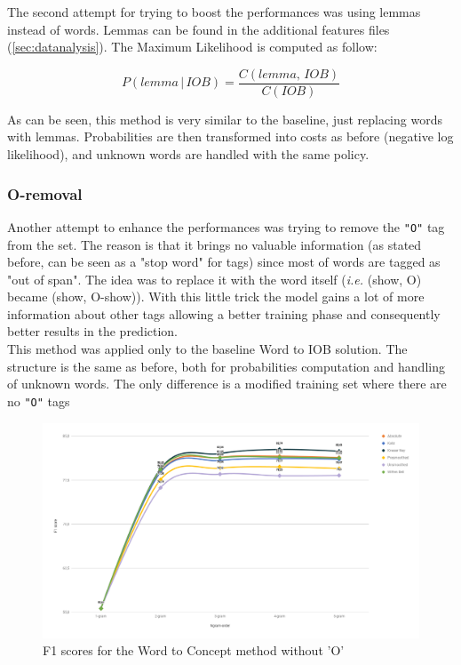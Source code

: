 \documentclass[11pt,a4paper]{article}
\begin{document}
The second attempt for trying to boost the performances was using lemmas instead of words. Lemmas can be found in the additional features files (\ref{sec:datanalysis}). The Maximum Likelihood is computed as follow:

\begin{equation}
\label{probl2iob}
	P(lemma\,|\,IOB)=\frac{C(lemma,\,IOB)}{C(IOB)}
\end{equation}

As can be seen, this method is very similar to the baseline, just replacing words with lemmas. Probabilities are then transformed into costs as before (negative log likelihood), and unknown words are handled with the same policy. 

\subsubsection{O-removal}

Another attempt to enhance the performances was trying to remove the {\tt "O"} tag from the set. The reason is that it brings no valuable information (as stated before, can be seen as a "stop word" for tags) since most of words are tagged as "out of span". The idea was to replace it with the word itself (\textit{i.e.} (show, O) became (show, O-show)). With this little trick the model gains a lot of more information about other tags allowing a better training phase and consequently better results in the prediction.\\

This method was applied only to the baseline Word to IOB solution. The structure is the same as before, both for probabilities computation and handling of unknown words. The only difference is a modified training set where there are no {\tt "O"} tags

\begin{figure}[h]
	\includegraphics[width=\textwidth]{img/chart.png}
	\caption{F1 scores for the Word to Concept method without 'O'}
\end{figure}
\end{document}

